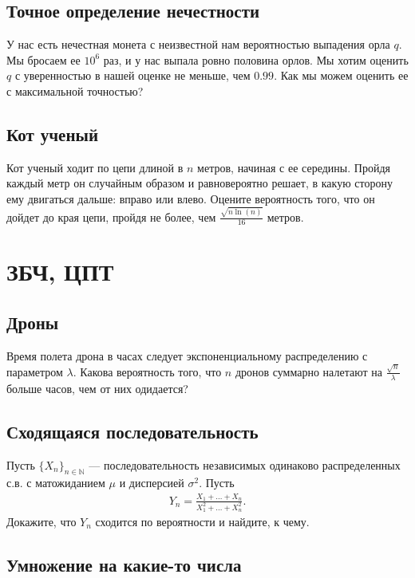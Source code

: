 \documentclass[12pt]{article}
\newcommand\N{\mathbb{N}}
\begin{document}
\subsection{Точное определение нечестности}

У нас есть нечестная монета с неизвестной нам вероятностью выпадения орла $q$. Мы бросаем ее $10^6$ раз, и у нас выпала ровно половина орлов. Мы хотим оценить $q$ с уверенностью в нашей оценке не меньше, чем $0.99$. Как мы можем оценить ее с максимальной точностью? 

\subsection{Кот ученый}

Кот ученый ходит по цепи длиной в $n$ метров, начиная с ее середины. Пройдя каждый метр он случайным образом и равновероятно решает, в какую сторону ему двигаться дальше: вправо или влево. Оцените вероятность того, что он дойдет до края цепи, пройдя не более, чем $\frac{\sqrt{n \ln(n)}}{16}$ метров.

\section{ЗБЧ, ЦПТ}

\subsection{Дроны}

Время полета дрона в часах следует экспоненциальному распределению с параметром $\lambda$. Какова вероятность того, что $n$ дронов суммарно налетают на $\frac{\sqrt{n}}{\lambda}$ больше часов, чем от них одидается?

\subsection{Сходящаяся последовательность}

Пусть $\{X_n\}_{n \in \N}$ --- последовательность независимых одинаково распределенных с.в. с матожиданием $\mu$ и дисперсией $\sigma^2$. Пусть 
\begin{align*}
    Y_n = \frac{X_1 + \dots + X_n}{X_1^2 + \dots + X_n^2}.
\end{align*}
Докажите, что $Y_n$ сходится по вероятности и найдите, к чему.

\subsection{Умножение на какие-то числа}
\end{document}
